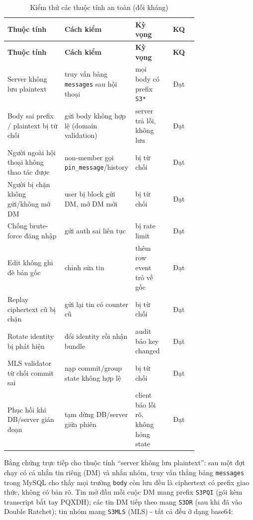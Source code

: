 \begin{longtable}{|p{0.30\linewidth}|p{0.34\linewidth}|p{0.12\linewidth}|c|}
\caption{Kiểm thử các thuộc tính an toàn (đối kháng)}\label{tab:security-properties}\\
\hline
\textbf{Thuộc tính} & \textbf{Cách kiểm} & \textbf{Kỳ vọng} & \textbf{KQ} \\ \hline
\endfirsthead
\hline
\textbf{Thuộc tính} & \textbf{Cách kiểm} & \textbf{Kỳ vọng} & \textbf{KQ} \\ \hline
\endhead
Server không lưu plaintext & truy vấn bảng \texttt{messages} sau hội thoại & mọi body có prefix \texttt{S3*} & Đạt \\ \hline
Body sai prefix / plaintext bị từ chối & gửi body không hợp lệ (domain validation) & server trả lỗi, không lưu & Đạt \\ \hline
Người ngoài hội thoại không thao tác được & non-member gọi \texttt{pin\_message}/history & bị từ chối & Đạt \\ \hline
Người bị chặn không gửi/không mở DM & user bị block gửi DM, mở DM mới & bị từ chối & Đạt \\ \hline
Chống brute-force đăng nhập & gửi auth sai liên tục & bị rate limit & Đạt \\ \hline
Edit không ghi đè bản gốc & chỉnh sửa tin & thêm row event trỏ về gốc & Đạt \\ \hline
Replay ciphertext cũ bị chặn & gửi lại tin có counter cũ & bị từ chối & Đạt \\ \hline
Rotate identity bị phát hiện & đổi identity rồi nhận bundle & audit báo key changed & Đạt \\ \hline
MLS validator từ chối commit sai & nạp commit/group state không hợp lệ & bị từ chối & Đạt \\ \hline
Phục hồi khi DB/server gián đoạn & tạm dừng DB/server giữa phiên & client báo lỗi rõ, không hỏng state & Đạt \\ \hline
\end{longtable}

Bằng chứng trực tiếp cho thuộc tính ``server không lưu plaintext'': sau một đợt chạy có cả nhắn tin riêng (DM) và nhắn nhóm, truy vấn thẳng bảng \texttt{messages} trong MySQL cho thấy mọi trường \texttt{body} còn lưu đều là ciphertext có prefix giao thức, không có bản rõ. Tin mở đầu mỗi cuộc DM mang prefix \texttt{S3PQI} (gói kèm transcript bắt tay PQXDH); các tin DM tiếp theo mang \texttt{S3DR} (sau khi đã vào Double Ratchet); tin nhóm mang \texttt{S3MLS} (MLS) - tất cả đều ở dạng base64:

